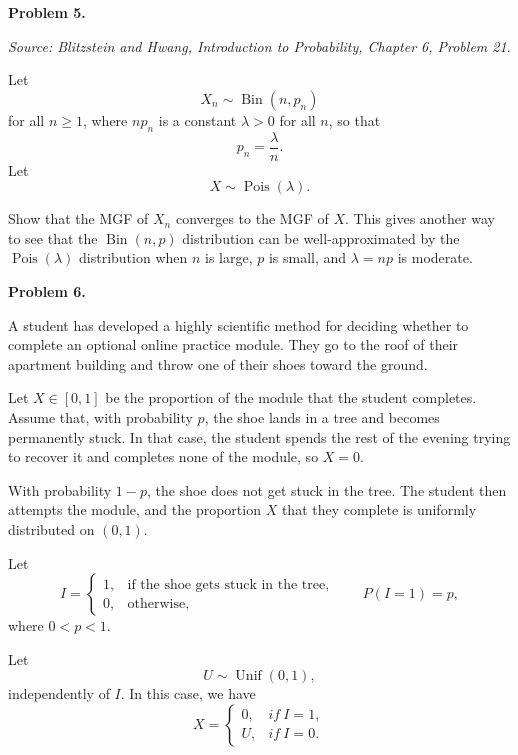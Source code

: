 \documentclass[11pt]{article}
\newcommand{\source}[2]{%
    \vspace{0.15cm}
    {\small\textit{Source: Blitzstein and Hwang, \textit{Introduction to Probability}, Chapter #1, Problem #2.}}
}
\begin{document}

\begin{problemheader}
\textbf{Problem 5. }
\end{problemheader}
\source{6}{21}

Let
\[
X_n\sim\operatorname{Bin}(n,p_n)
\]
for all $n\ge1$, where $np_n$ is a constant $\lambda>0$ for all $n$, so that
\[
p_n=\frac{\lambda}{n}.
\]
Let
\[
X\sim\operatorname{Pois}(\lambda).
\]

Show that the MGF of $X_n$ converges to the MGF of $X$. This gives another way to see that the $\operatorname{Bin}(n,p)$ distribution can be well-approximated by the $\operatorname{Pois}(\lambda)$ distribution when $n$ is large, $p$ is small, and $\lambda=np$ is moderate.
 
\newpage








 

\begin{problemheader}
\textbf{Problem 6. }
\end{problemheader}

A student has developed a highly scientific method for deciding whether to
complete an optional online practice module. They go to the roof of their
apartment building and throw one of their shoes toward the ground.

Let $X\in[0,1]$ be the proportion of the module that the student completes.
Assume that, with probability \(p\), the shoe lands in a tree and becomes
permanently stuck. In that case, the student spends the rest of the evening
trying to recover it and completes none of the module, so \(X=0\).

With probability \(1-p\), the shoe does not get stuck in the tree. The student
then attempts the module, and the proportion \(X\) that they complete is
uniformly distributed on \((0,1)\).

Let
\[
I=
\begin{cases}
1, & \text{if the shoe gets stuck in the tree},\\
0, & \text{otherwise},
\end{cases}
\qquad
P(I=1)=p,
\]
where \(0<p<1\).

Let
\[
U\sim\operatorname{Unif}(0,1),
\]
independently of \(I\). In this case, we have
\[
X=
\begin{cases}
0, & if \ I=1,\\
U, & if \ I=0.
\end{cases}
\]
\end{document}
